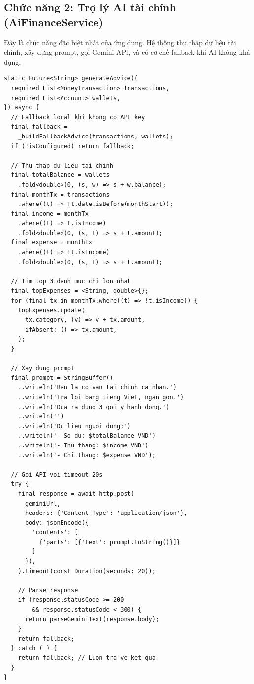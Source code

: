 \subsection{Chức năng 2: Trợ lý AI tài chính (AiFinanceService)}

Đây là chức năng đặc biệt nhất của ứng dụng. Hệ thống thu thập dữ liệu tài chính, xây dựng prompt, gọi Gemini API, và có cơ chế fallback khi AI không khả dụng.

\begin{lstlisting}[caption={AiFinanceService --- Xây dựng prompt và gọi Gemini API}]
static Future<String> generateAdvice({
  required List<MoneyTransaction> transactions,
  required List<Account> wallets,
}) async {
  // Fallback local khi khong co API key
  final fallback =
    _buildFallbackAdvice(transactions, wallets);
  if (!isConfigured) return fallback;

  // Thu thap du lieu tai chinh
  final totalBalance = wallets
    .fold<double>(0, (s, w) => s + w.balance);
  final monthTx = transactions
    .where((t) => !t.date.isBefore(monthStart));
  final income = monthTx
    .where((t) => t.isIncome)
    .fold<double>(0, (s, t) => s + t.amount);
  final expense = monthTx
    .where((t) => !t.isIncome)
    .fold<double>(0, (s, t) => s + t.amount);

  // Tim top 3 danh muc chi lon nhat
  final topExpenses = <String, double>{};
  for (final tx in monthTx.where((t) => !t.isIncome)) {
    topExpenses.update(
      tx.category, (v) => v + tx.amount,
      ifAbsent: () => tx.amount,
    );
  }

  // Xay dung prompt
  final prompt = StringBuffer()
    ..writeln('Ban la co van tai chinh ca nhan.')
    ..writeln('Tra loi bang tieng Viet, ngan gon.')
    ..writeln('Dua ra dung 3 goi y hanh dong.')
    ..writeln('')
    ..writeln('Du lieu nguoi dung:')
    ..writeln('- So du: $totalBalance VND')
    ..writeln('- Thu thang: $income VND')
    ..writeln('- Chi thang: $expense VND');

  // Goi API voi timeout 20s
  try {
    final response = await http.post(
      geminiUrl,
      headers: {'Content-Type': 'application/json'},
      body: jsonEncode({
        'contents': [
          {'parts': [{'text': prompt.toString()}]}
        ]
      }),
    ).timeout(const Duration(seconds: 20));

    // Parse response
    if (response.statusCode >= 200
        && response.statusCode < 300) {
      return parseGeminiText(response.body);
    }
    return fallback;
  } catch (_) {
    return fallback; // Luon tra ve ket qua
  }
}
\end{lstlisting}

